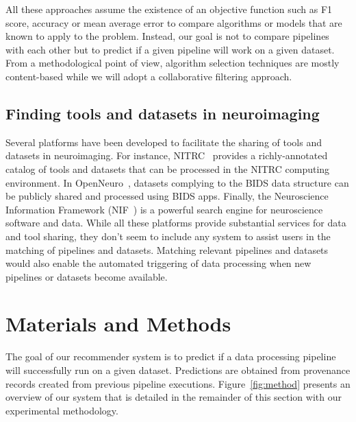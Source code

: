 \documentclass[conference]{IEEEtran}
\begin{document}
All these approaches assume the existence of an objective function such as F1 score, accuracy or mean average error to compare algorithms or models that are known to apply to the problem. Instead, our goal is not to compare pipelines with each other but to predict if a given pipeline will work on a given dataset. From a methodological point of view, algorithm selection techniques are mostly content-based  while we will adopt a collaborative filtering approach.

\subsection{Finding tools and datasets in neuroimaging}

Several platforms have been developed to facilitate the sharing of tools and datasets 
in neuroimaging. For instance, NITRC~\cite{kennedy2016nitrc} provides a richly-annotated catalog of tools and datasets that can be processed in the NITRC computing environment. In OpenNeuro~\cite{markiewicz2021openneuro}, datasets complying to the BIDS data structure can be publicly shared and processed using BIDS apps.  Finally, the Neuroscience Information Framework (NIF~\cite{gardner2008neuroscience}) is a powerful search engine for neuroscience software and data. While all these platforms provide substantial services for data and tool sharing, they don't seem to include any system to assist users in the matching of pipelines and datasets.  Matching relevant pipelines and datasets would also enable the automated triggering of data processing when new pipelines or datasets become available. 

\section{Materials and Methods}

The goal of our recommender system is to predict if a data processing
pipeline will successfully run on a given dataset. Predictions are obtained
from provenance records created from previous pipeline executions.
Figure~\ref{fig:method} presents an overview of our system that is detailed
in the remainder of this section with our experimental methodology.
\end{document}

